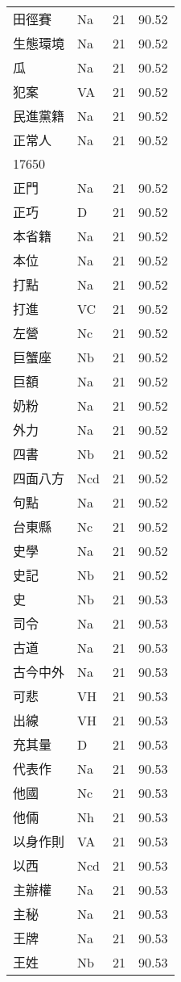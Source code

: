 \documentclass[twocolumn]{book}
\begin{document}
\begin{supertabular}{llrr}
田徑賽 & Na & 21 &  90.52\\
生態環境 & Na & 21 &  90.52\\
瓜 & Na & 21 &  90.52\\
犯案 & VA & 21 &  90.52\\
民進黨籍 & Na & 21 &  90.52\\
正常人 & Na & 21 &  90.52\\
17650\\
正門 & Na & 21 &  90.52\\
正巧 & D & 21 &  90.52\\
本省籍 & Na & 21 &  90.52\\
本位 & Na & 21 &  90.52\\
打點 & Na & 21 &  90.52\\
打進 & VC & 21 &  90.52\\
左營 & Nc & 21 &  90.52\\
巨蟹座 & Nb & 21 &  90.52\\
巨額 & Na & 21 &  90.52\\
奶粉 & Na & 21 &  90.52\\
外力 & Na & 21 &  90.52\\
四書 & Nb & 21 &  90.52\\
四面八方 & Ncd & 21 &  90.52\\
句點 & Na & 21 &  90.52\\
台東縣 & Nc & 21 &  90.52\\
史學 & Na & 21 &  90.52\\
史記 & Nb & 21 &  90.52\\
史 & Nb & 21 &  90.53\\
司令 & Na & 21 &  90.53\\
古道 & Na & 21 &  90.53\\
古今中外 & Na & 21 &  90.53\\
可悲 & VH & 21 &  90.53\\
出線 & VH & 21 &  90.53\\
充其量 & D & 21 &  90.53\\
代表作 & Na & 21 &  90.53\\
他國 & Nc & 21 &  90.53\\
他倆 & Nh & 21 &  90.53\\
以身作則 & VA & 21 &  90.53\\
以西 & Ncd & 21 &  90.53\\
主辦權 & Na & 21 &  90.53\\
主秘 & Na & 21 &  90.53\\
王牌 & Na & 21 &  90.53\\
王姓 & Nb & 21 &  90.53\\

\end{supertabular}
\end{document}
